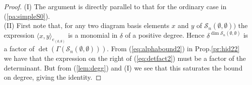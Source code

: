 \documentclass[reqno,10pt,a4paper]{amsart}
\newcommand{\C}{\mathbb{C}}
\newcommand{\blue}[1]{\textcolor{blue}{#1}}
\newcommand{\red}[1]{\textcolor{red}{#1}}
\newcommand{\ppm}[1]{\red{#1}}
\newcommand{\ca}[1]{\blue{#1}}
\newcommand{\kn}{k}
\newcommand{\nk}{n}  %
\newcommand{\cell}{\mathcal{S}}
\newcommand{\ignore}[1]{}
\newcommand{\Gram}{\Gamma}
\begin{document}
\begin{proof}
(I) The argument is directly parallel to that for the ordinary case in (\ref{pa:simpleS0}). 
\\
(II) 
First note that, for any two diagram basis  {elements}
$x$ and $y$ of $\cell_\nk(\emptyset,\emptyset)) $ the expression 
$ \langle x, y\rangle_{e_{(\emptyset,\emptyset)}}$ 
is a monomial in $\delta$ of a positive degree. Hence 
$\delta^{\dim \cell_\nk(\emptyset,\emptyset)}$ is a factor of 
$\det (\Gram(\cell_\nk(\emptyset,\emptyset) ))$. 
From (\ref{eq:alphabound2}) 
in Prop.\ref{pr:hid22}
we have that the expression on the right of (\ref{eq:detfact2}) 
must be a factor of the determinant. 
But from 
(\ref{lem:degg}) 
and (I)   %
we see that this saturates the bound on degree, giving the identity.
\ignore{{ 
\footnote{
\ppm{[now DELETE the rest???]}\ca{[yes]}
%
For each $\delta=\kn\geq1$, by Proposition~\ref{dimL=rank} we have 
$\;\dim L_\nk^{\delta=\kn}(\emptyset,\emptyset)
\; =\;  rank( \langle -, -\rangle_{e_{(\emptyset,\emptyset)}}|_{\delta=k})$.
But 
$$
\; rank \langle -, -\rangle_{e_{(\emptyset,\emptyset)}}
=\dim \cell_\nk(\emptyset,\emptyset)-\dim
rad(\cell_\nk(\emptyset,\emptyset)),
$$
\ppm{by ????}.
Hence 
\ppm{[-explain?! - do we need to say that $\C[\delta]$ is a PID so gram matrix has a Smith form with entries in $\C[\delta]$? But evaluating at $k$ the rank is determined by the number of diagonal entries in the Smith form that vanish...]}
$\; (\delta-\kn)^{\dim
rad(\cell_\nk(\emptyset,\emptyset))}$ is also a factor of 
$\det
(\Gram(\cell_\nk(\emptyset,\emptyset) ))$. 
Hence, the degree of $\det
(\Gram(\cell_\nk(\emptyset,\emptyset) ))$ is bounded below by $\dim \cell_\nk(\emptyset,\emptyset)+\sum \dim
rad(\cell_\nk(\emptyset,\emptyset))$, and comparing these two expressions one can see that the bound in fact saturates. } 
}}
\end{proof}



\end{document}
